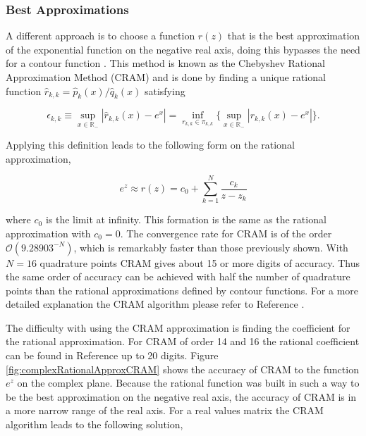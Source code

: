 \subsubsection{Best Approximations}
A different approach is to choose a function $r(z)$ that is the best approximation of the exponential function on the negative real axis, doing this bypasses the need for a contour function \cite{pusaThesis} \cite{Trefethen2006}. This method is known as the Chebyshev Rational Approximation Method (CRAM) and is done by finding a unique rational function $\hat{r}_{k,k} = \hat{p}_{k}(x)/\hat{q}_{k}(x)$ satisfying 

\begin{equation}
    \epsilon_{k,k} \equiv \sup_{x \in \mathbb{R}_{-}} |\hat{r}_{k,k}(x) - e^{x}| = \inf_{r_{k,k} \in \pi_{k,k}}\bigg\{ \sup_{x \in \mathbb{R}_{-}} |r_{k,k}(x) - e^{x}|\bigg\}.
\end{equation}

\noindent Applying this definition leads to the following form on the rational approximation,

\begin{equation}
    e^{z} \approx r(z) = c_{0} + \sum_{k=1}^{N}\frac{c_{k}}{z - z_{k}}
\end{equation}


\noindent where $c_{0}$ is the limit at infinity. This formation is the same as the rational approximation with $c_{0} = 0$. The convergence rate for CRAM is of the order $\mathcal{O}(9.28903^{-N} )$, which is remarkably faster than those previously shown. With $N=16$ quadrature points CRAM gives about 15 or more digits of accuracy. Thus the same order of accuracy can be achieved with half the number of quadrature points than the rational approximations defined by contour functions. For a more detailed explanation the CRAM algorithm please refer to Reference \cite{pusaThesis}. 

The difficulty with using the CRAM approximation is finding the coefficient for the rational approximation. For CRAM of order 14 and 16 the rational coefficient can be found in Reference \cite{pusa2011} up to 20 digits. Figure \ref{fig:complexRationalApproxCRAM} shows the accuracy of CRAM to the function $e^{z}$ on the complex plane. Because the rational function was built in such a way to be the best approximation on the negative real axis, the accuracy of CRAM is in a more narrow range of the real axis. For a real values matrix the CRAM algorithm leads to the following solution,



